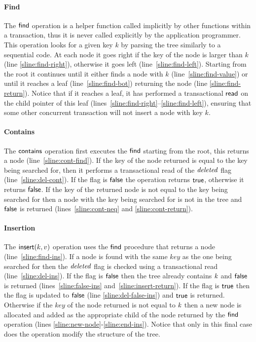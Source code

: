 \paragraph{Find} 
The $\act{find}$ operation is a helper function called implicitly by other functions within a transaction, 
thus it is never called explicitly by the application programmer.
This operation looks for a given key $k$ by parsing the tree similarly to a sequential code.
At each node it goes right if the key of the node is larger than $k$ (line \ref{sline:find-right}), otherwise it goes left (line~\ref{sline:find-left}).
Starting from the root it continues until it either finds a node with $k$ (line~\ref{sline:find-value}) or until it reaches a leaf (line~\ref{sline:find-bot}) 
returning the node (line \ref{sline:find-return}).
Notice that if it reaches a leaf, it has performed a transactional $\act{read}$ on the child pointer of this leaf (lines~\ref{sline:find-right}--\ref{sline:find-left}), ensuring that 
some other concurrent transaction will not insert a node with key $k$.

\paragraph{Contains} 
The $\act{contains}$ operation first executes the $\act{find}$ starting from the root, this returns a node (line~\ref{sline:cont-find}).
If the key of the node returned is equal to the key being searched for, then it performs a transactional read of the $\ms{deleted}$ flag (line~\ref{sline:del-cont}).
If the flag is $\lit{false}$ the operation returns $\lit{true}$, otherwise it returns $\lit{false}$.
If the key of the returned node is not equal to the key being searched for then a node with the key being searched for is not in the tree and $\lit{false}$ is returned (lines~\ref{sline:cont-neq} and \ref{sline:cont-return}).

\paragraph{Insertion} The $\act{insert}(k,v)$ operation uses the $\act{find}$ procedure that returns a node (line~\ref{sline:find-ins}).
If a node is found with the same $key$ as the one being searched for then the $\ms{deleted}$ flag is checked using a transactional read (line~\ref{sline:del-ins}).
If the flag is $\lit{false}$ then the tree already contains $\ms{k}$ and $\lit{false}$ is returned (lines~\ref{sline:false-ins} and~\ref{sline:insert-return}).
If the flag is $\lit{true}$ then the flag is updated to $\lit{false}$ (line \ref{sline:del-false-ins}) and $\lit{true}$ is returned.
Otherwise if the $key$ of the node returned is not equal to $\ms{k}$ then a new node is allocated and added as the
appropriate child of the node returned by the $\act{find}$ operation (lines \ref{sline:new-node}-\ref{sline:end-ins}).
Notice that only in this final case does the operation modify the structure of the tree.

